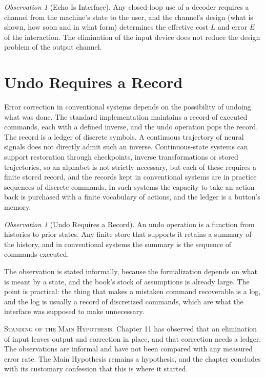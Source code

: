 \documentclass[11pt,twoside,openany]{book}
\theoremstyle{definition}
\theoremstyle{remark}
\newtheorem{observation}[theorem]{Observation}
\newenvironment{standing}{\par\medskip\noindent\hrulefill\par\smallskip\noindent\textsc{Standing of the Main Hypothesis.}\enspace}{\par\smallskip\noindent\hrulefill\par\medskip}
\begin{document}
\begin{observation}[Echo Is Interface]
Any closed-loop use of a decoder requires a channel from the machine's state to the user, and the channel's design (what is shown, how soon and in what form) determines the effective cost $L$ and error $E$ of the interaction. The elimination of the input device does not reduce the design problem of the output channel.
\end{observation}

\section{Undo Requires a Record}

Error correction in conventional systems depends on the possibility of undoing what was done. The standard implementation maintains a record of executed commands, each with a defined inverse, and the undo operation pops the record. The record is a ledger of discrete symbols. A continuous trajectory of neural signals does not directly admit such an inverse. Continuous-state systems can support restoration through checkpoints, inverse transformations or stored trajectories, so an alphabet is not strictly necessary, but each of these requires a finite stored record, and the records kept in conventional systems are in practice sequences of discrete commands. In such systems the capacity to take an action back is purchased with a finite vocabulary of actions, and the ledger is a button's memory.

\begin{observation}[Undo Requires a Record]
An undo operation is a function from histories to prior states. Any finite store that supports it retains a summary of the history, and in conventional systems the summary is the sequence of commands executed.
\end{observation}

The observation is stated informally, because the formalization depends on what is meant by a state, and the book's stock of assumptions is already large. The point is practical: the thing that makes a mistaken command recoverable is a log, and the log is usually a record of discretized commands, which are what the interface was supposed to make unnecessary.

\begin{standing}
Chapter 11 has observed that an elimination of input leaves output and correction in place, and that correction needs a ledger. The observations are informal and have not been compared with any measured error rate. The Main Hypothesis remains a hypothesis, and the chapter concludes with its customary confession that this is where it started.
\end{standing}
\end{document}
